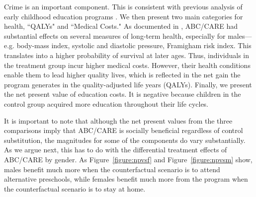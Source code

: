 Crime is an important component. This is consistent with previous analysis of early childhood education programs \citep{Heckman_Moon_etal_2010_RateofReturn}. We then present two main categories for health, ``QALYs" and ``Medical Costs." As documented in \citet{Campbell_Conti_etal_2014_EarlyChildhoodInvestments}, ABC/CARE had substantial effects on several measures of long-term health, especially for males---e.g. body-mass index, systolic and diastolic pressure, Framigham risk index. This translates into a higher probability of survival at later ages. Thus, individuals in the treatment group incur higher medical costs. However, their health conditions enable them to lead higher quality lives, which is reflected in the net gain the program generates in the quality-adjusted life years (QALYs). Finally, we present the net present value of education costs. It is negative because children in the control group acquired more education throughout their life cycles. 

It is important to note that although the net present values from the three comparisons imply that ABC/CARE is socially beneficial regardless of control substitution, the magnitudes for some of the components do vary substantially. As we argue next, this has to do with the differential treatment effects of ABC/CARE by gender. As Figure~\ref{figure:npvsf} and Figure~\ref{figure:npvsm} show, males benefit much more when the counterfactual scenario is to attend alternative preschools, while females benefit much more from the program when the counterfactual scenario is to stay at home.

